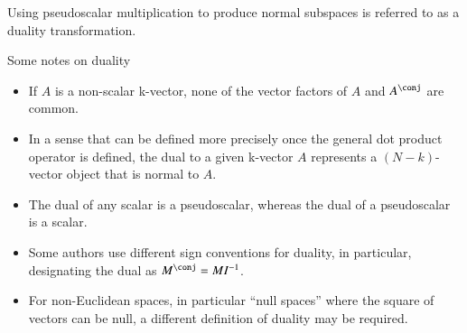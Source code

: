 Using pseudoscalar multiplication to produce normal subspaces
is referred to as a duality transformation.


Some notes on duality

\begin{itemize}
\item If \( A \) is a non-scalar k-vector, none of the vector factors of \( A \) and \( A^\conj \) are common.
\item In a sense that can be defined more precisely once the general dot product operator is defined, the dual to a given k-vector \( A \) represents a \((N-k)\)-vector object that is normal to \( A \).
\item The dual of any scalar is a pseudoscalar, whereas the dual of a pseudoscalar is a scalar.
\item Some authors use different sign conventions for duality, in particular, designating the dual as \( M^\conj = M I^{-1} \).
\item For non-Euclidean spaces, in particular ``null spaces'' where the square of vectors can be null, a different definition of duality may be required.
\end{itemize}





